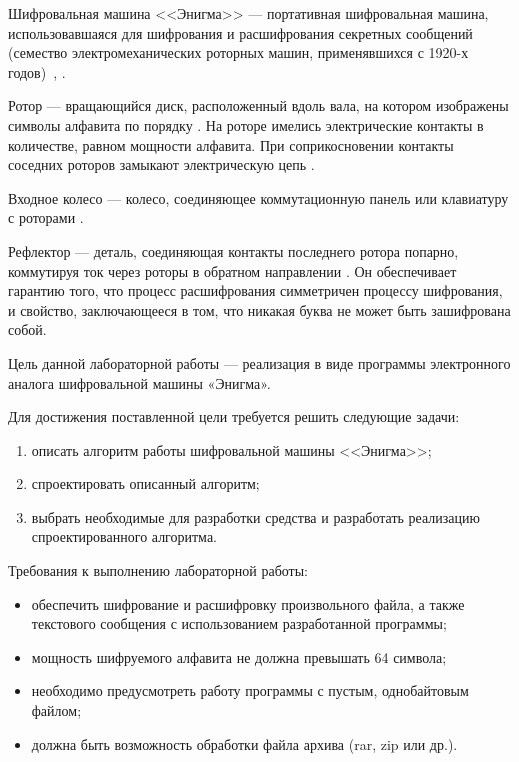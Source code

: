 
Шифровальная машина <<Энигма>> --- портативная шифровальная машина, использовавшаяся для шифрования и расшифрования секретных сообщений (семество электромеханических роторных машин, применявшихся с 1920-х годов)~\cite{попов1история}, \cite{бабаш2015информационная}.

Ротор --- вращающийся диск, расположенный вдоль вала, на котором изображены символы алфавита по порядку \cite{шолин2018алгоритм}.
На роторе имелись электрические контакты в количестве, равном мощности алфавита.
При соприкосновении контакты соседних роторов замыкают электрическую цепь \cite{бабаш2015информационная}.

Входное колесо --- колесо, соединяющее коммутационную панель или клавиатуру с роторами \cite{бабаш2015информационная}.

Рефлектор --- деталь, соединяющая контакты последнего ротора попарно, коммутируя ток через роторы в обратном направлении \cite{бабаш2015информационная}.
Он обеспечивает гарантию того, что процесс расшифрования симметричен процессу шифрования, и свойство, заключающееся в том, что никакая буква не может быть зашифрована собой.

Цель данной лабораторной работы --- реализация в виде программы электронного аналога шифровальной машины «Энигма».

Для достижения поставленной цели требуется решить следующие задачи:
\begin{enumerate}
	\item описать алгоритм работы шифровальной машины <<Энигма>>;
	\item спроектировать описанный алгоритм;
	\item выбрать необходимые для разработки средства и разработать реализацию спроектированного алгоритма.
\end{enumerate}

Требования к выполнению лабораторной работы:
\begin{itemize}
	\item обеспечить шифрование и расшифровку произвольного файла, а также текстового сообщения с использованием разработанной программы;
	\item мощность шифруемого алфавита не должна превышать 64 символа;
	\item необходимо предусмотреть работу программы с пустым, однобайтовым файлом;
	\item должна быть возможность обработки файла архива (rar, zip или др.).
\end{itemize}

